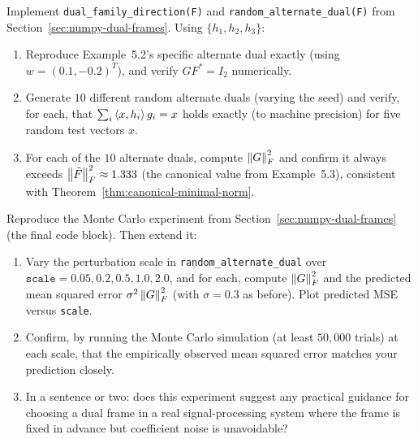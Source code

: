 \begin{exercisebox}[title={Lab Exercise 5.2: Verifying the Dual Family}]
\label{lab:dual-family-numerics}
Implement \texttt{dual\_family\_direction(F)} and
\texttt{random\_alternate\_dual(F)} from
Section~\ref{sec:numpy-dual-frames}. Using $\{h_1,h_2,h_3\}$:
\begin{enumerate}[label=(\alph*)]
  \item Reproduce Example~5.2's specific alternate dual exactly (using
        $w=(0.1,-0.2)^T$), and verify $GF^*=I_2$ numerically.
  \item Generate $10$ different random alternate duals (varying the
        seed) and verify, for each, that $\sum_i\left\langle x, h_i \right\rangle g_i=x$
        holds exactly (to machine precision) for five random test
        vectors $x$.
  \item For each of the $10$ alternate duals, compute $\left\| G \right\|_F^2$
        and confirm it always exceeds $\left\| \tilde F \right\|_F^2 \approx
        1.333$ (the canonical value from Example~5.3), consistent with
        Theorem~\ref{thm:canonical-minimal-norm}.
\end{enumerate}
\end{exercisebox}

\begin{exercisebox}[title={Lab Exercise 5.3: Monte Carlo Stability Comparison}]
\label{lab:stability-numerics}
Reproduce the Monte Carlo experiment from
Section~\ref{sec:numpy-dual-frames} (the final code block). Then extend
it:
\begin{enumerate}[label=(\alph*)]
  \item Vary the perturbation scale in
        \texttt{random\_alternate\_dual} over
        $\texttt{scale}=0.05, 0.2, 0.5, 1.0, 2.0$, and for each, compute
        $\left\| G \right\|_F^2$ and the predicted mean squared error
        $\sigma^2\left\| G \right\|_F^2$ (with $\sigma=0.3$ as before). Plot
        predicted MSE versus \texttt{scale}.
  \item Confirm, by running the Monte Carlo simulation (at least
        $50{,}000$ trials) at each scale, that the empirically observed
        mean squared error matches your prediction closely.
  \item In a sentence or two: does this experiment suggest any practical
        guidance for choosing a dual frame in a real signal-processing
        system where the frame is fixed in advance but coefficient noise
        is unavoidable?
\end{enumerate}
\end{exercisebox}

